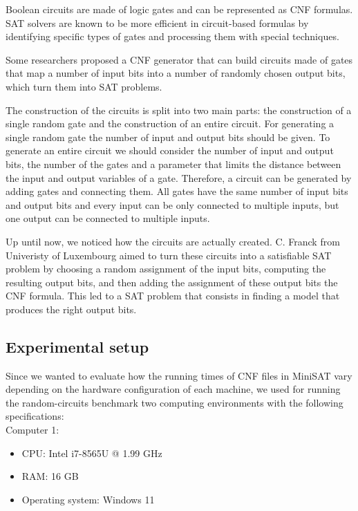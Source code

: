 \documentclass[runningheads]{llncs}
\begin{document}
Boolean circuits are made of logic gates and can be represented as CNF formulas.  SAT solvers are known to be more efficient in circuit-based formulas by identifying specific types of gates and processing them with special techniques.

Some researchers proposed a CNF generator that can build circuits made of gates that map a number of input bits into a number of randomly chosen output bits, which turn them into SAT problems.

The construction of the circuits is split into two main parts: the construction of a single random gate and the construction of an entire circuit. For generating a single random gate the number of input and output bits should be given. To generate an entire circuit we should consider the number of input and output bits, the number of the gates and a parameter that limits the distance between the input and output variables of a gate. Therefore, a circuit can be generated by adding gates and connecting them. All gates have the same number of input bits and output bits and every input can be only connected to multiple inputs, but one output can be connected to multiple inputs.

Up until now, we noticed how the circuits are actually created. C. Franck from Univeristy of Luxembourg aimed to turn these circuits into a satisfiable SAT problem by choosing a random assignment of the input bits, computing the resulting output bits, and then adding the assignment of these output bits the CNF formula. This led to a SAT problem that consists in finding a model that produces the right output bits.

\subsection{Experimental setup}

Since we wanted to evaluate how the running times of CNF files in MiniSAT vary depending on the hardware configuration of each machine, we used for running the random-circuits benchmark two computing environments with the following specifications:\\

Computer 1: 
\begin{itemize}
  \item CPU: Intel i7-8565U @ 1.99 GHz
  \item RAM: 16 GB
   \item Operating system: Windows 11
\end{itemize}
\end{document}
